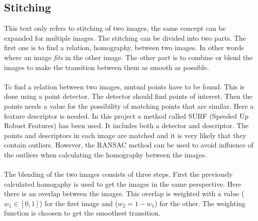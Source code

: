 \subsection{Stitching}
This text only refers to stitching of two images, the same concept can be expanded for multiple images. The stitching can be divided into two parts. The first one is to find a relation, homography, between two images. In other words where an image {\it fits} in the other image. The other part is to combine or blend the images to make the transition between them as smooth as possible.
\\\\
To find a relation between two images, mutual points have to be found. This is done using a point detector. The detector should find points of interest. Then the points needs a value for the possibility of matching points that are similar. Here a feature descriptor is needed. In this project a method called SURF (Speeded Up Robust Features) has been used. It includes both a detector and descriptor. The points and descriptors in each image are matched and it is very likely that they contain outliers. However, the RANSAC method can be used to avoid influence of the outliers when calculating the homography between the images.
\\\\
The blending of the two images consists of three steps. First the previously calculated homogaphy is used to get the images in the same perspective. Here there is an overlap between the images. This overlap is weighted with a value ($w_1 \in [0, 1]$) for the first image and ($w_2 = 1 - w_1$) for the other. The weighting function is choosen to get the smoothest transition.
